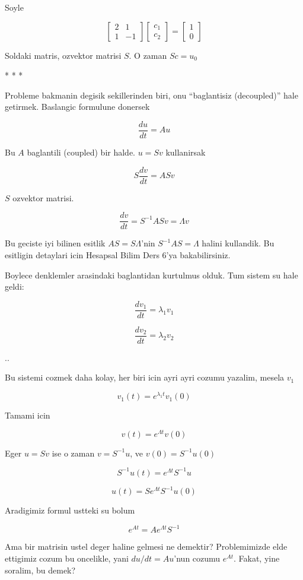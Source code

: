 \documentclass[12pt,fleqn]{article}
\begin{document}
Soyle

\[ 
\left[\begin{array}{cc}
2 & 1 \\ 1 & -1
\end{array}\right]
\left[\begin{array}{c}
c_1 \\ c_2
\end{array}\right] 
=
\left[\begin{array}{c}
1 \\ 0
\end{array}\right] 
 \]

Soldaki matris, ozvektor matrisi $S$. O zaman $Sc = u_0$ 

* * *

Probleme bakmanin degisik sekillerinden biri, onu ``baglantisiz
(decoupled)'' hale getirmek. Baslangic formulune donersek

\[ \frac{du}{dt} = Au \]

Bu $A$ baglantili (coupled) bir halde. $u = Sv$ kullanirsak

\[ S\frac{dv}{dt} = ASv\]

$S$ ozvektor matrisi. 

\[ \frac{dv}{dt} = S^{-1}ASv = \Lambda v\]

Bu geciste iyi bilinen esitlik $AS=S\Lambda$'nin $S^{-1}AS = \Lambda$
halini kullandik. Bu esitligin detaylari icin Hesapsal Bilim Ders 6'ya
bakabilirsiniz.

Boylece denklemler arasindaki baglantidan kurtulmus olduk. Tum sistem su
hale geldi:

\[ \frac{dv_1}{dt} = \lambda_1 v_1\]

\[ \frac{dv_2}{dt} = \lambda_2 v_2\]

..

Bu sistemi cozmek daha kolay, her biri icin ayri ayri cozumu yazalim,
mesela $v_1$

\[ v_1(t) = e^{\lambda_1 t} v_1(0) \]

Tamami icin

\[ v(t) = e^{\Lambda t} v(0) \]

Eger $u=Sv$ ise o zaman $v=S^{-1}u$, ve $v(0)=S^{-1}u(0)$

\[ S^{-1}u(t) = e^{\Lambda t} S^{-1}u \]

\[ u(t) = Se^{\Lambda t}S^{-1} u(0) \]

Aradigimiz formul ustteki su bolum

\[ e^{At} = Ae^{\Lambda t} S^{-1} \]

Ama bir matrisin ustel deger haline gelmesi ne demektir? Problemimizde elde
ettigimiz cozum bu oncelikle, yani $du/dt = Au$'nun cozumu $e^{At}$. Fakat,
yine soralim, bu demek? 
\end{document}
